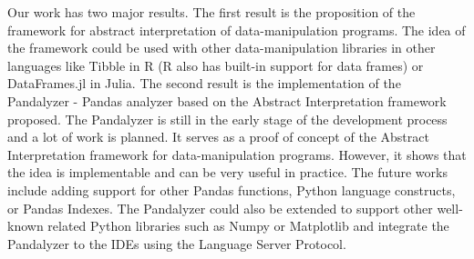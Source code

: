 \large
Our work has two major results.
The first result is the proposition of the framework for abstract interpretation of data-manipulation programs.
The idea of the framework could be used with other data-manipulation libraries in other languages like
Tibble in R (R also has built-in support for data frames) or DataFrames.jl in Julia.
The second result is the implementation of the Pandalyzer - Pandas analyzer based
on the Abstract Interpretation framework proposed.
The Pandalyzer is still in the early stage of the development process and a lot of work is planned.
It serves as a proof of concept of the Abstract Interpretation framework for data-manipulation programs.
However, it shows that the idea is implementable and can be very useful in practice.
The future works include adding support for other Pandas functions, Python language constructs, or Pandas Indexes.
The Pandalyzer could also be extended to support other well-known related Python libraries such as Numpy or Matplotlib
and integrate the Pandalyzer to the IDEs using the Language Server Protocol.

